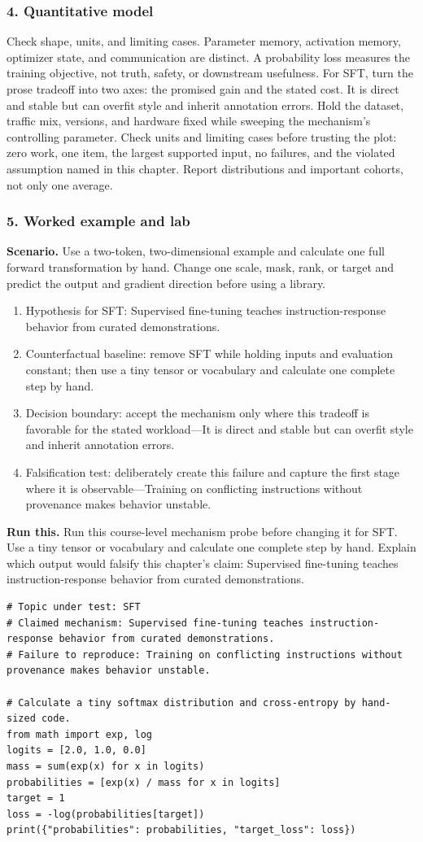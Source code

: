 \subsubsection*{4. Quantitative model}
Check shape, units, and limiting cases. Parameter memory, activation memory, optimizer state, and communication are distinct. A probability loss measures the training objective, not truth, safety, or downstream usefulness.
For SFT, turn the prose tradeoff into two axes: the promised gain and the stated cost. It is direct and stable but can overfit style and inherit annotation errors. Hold the dataset, traffic mix, versions, and hardware fixed while sweeping the mechanism's controlling parameter.
Check units and limiting cases before trusting the plot: zero work, one item, the largest supported input, no failures, and the violated assumption named in this chapter. Report distributions and important cohorts, not only one average.
\subsubsection*{5. Worked example and lab}
\textbf{Scenario.} Use a two-token, two-dimensional example and calculate one full forward transformation by hand. Change one scale, mask, rank, or target and predict the output and gradient direction before using a library.
\begin{enumerate}
\item Hypothesis for SFT: Supervised fine-tuning teaches instruction-response behavior from curated demonstrations.
\item Counterfactual baseline: remove SFT while holding inputs and evaluation constant; then use a tiny tensor or vocabulary and calculate one complete step by hand.
\item Decision boundary: accept the mechanism only where this tradeoff is favorable for the stated workload—It is direct and stable but can overfit style and inherit annotation errors.
\item Falsification test: deliberately create this failure and capture the first stage where it is observable—Training on conflicting instructions without provenance makes behavior unstable.
\end{enumerate}
\textbf{Run this.} Run this course-level mechanism probe before changing it for SFT. Use a tiny tensor or vocabulary and calculate one complete step by hand. Explain which output would falsify this chapter's claim: Supervised fine-tuning teaches instruction-response behavior from curated demonstrations.
\begin{Verbatim}[fontsize=\scriptsize]
# Topic under test: SFT
# Claimed mechanism: Supervised fine-tuning teaches instruction-response behavior from curated demonstrations.
# Failure to reproduce: Training on conflicting instructions without provenance makes behavior unstable.

# Calculate a tiny softmax distribution and cross-entropy by hand-sized code.
from math import exp, log
logits = [2.0, 1.0, 0.0]
mass = sum(exp(x) for x in logits)
probabilities = [exp(x) / mass for x in logits]
target = 1
loss = -log(probabilities[target])
print({"probabilities": probabilities, "target_loss": loss})
\end{Verbatim}
